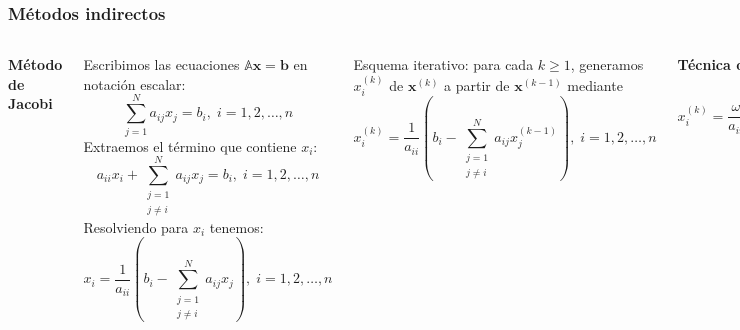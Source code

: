 \documentclass[9pt, aspectratio=169]{beamer}
\begin{document}
\begin{frame}
 \frametitle{Métodos indirectos}
 \begin{columns}[]
\textbf{Método de Jacobi}

Escribimos las ecuaciones $\mathbb{A} \mathbf{x}= \mathbf{b}$ en notación escalar:
\begin{equation*}
 \sum_{j=1}^N a_{ij}x_j = b_i, \; i = 1, 2, \ldots, n
\end{equation*}
Extraemos el término que contiene $x_i$:
\begin{equation*}
 a_{ii}x_i + \sum_{\substack{j=1 \\j \neq i}}^N a_{ij}x_j = b_i, \; i = 1, 2, \ldots, n
\end{equation*}
Resolviendo para $x_i$ tenemos:
\begin{equation*}
 x_i = \dfrac{1}{a_{ii}} \left( b_i - \sum_{\substack{j=1 \\j \neq i}}^N a_{ij}x_j \right), \;  i = 1, 2, \ldots, n
\end{equation*}
 

 Esquema iterativo: para cada $k \geq 1$, generamos $x_i^{(k)}$ de $\bm{x}^{(k)}$ a partir de $\bm{x}^{(k-1)}$ mediante
\begin{equation*}
    x_i^{(k)} = \dfrac{1}{a_{ii}} \left( b_i - \sum_{\substack{j=1 \\j \neq i}}^N a_{ij}x_j^{(k-1)} \right), \;  i = 1, 2, \ldots, n
\end{equation*} \pause

  \textbf{Técnica de relajación:}
\begin{equation*}
    x_i^{(k)} = \dfrac{\omega}{a_{ii}} \left( b_i - \sum_{\substack{j=1 \\j \neq i}}^N a_{ij}x_j^{(k-1)}  \right) + (1-\omega)x_i^{(k - 1)} 
\end{equation*}

Determinación de $\omega$:
Si $\Delta x^{(k)} = \vert x^{(k-1)}-x^{(k)} \vert$ calculado con $\omega = 1$:
\begin{equation*}
 \omega_{\text{opt}} \approx \dfrac{2}{1+\sqrt{1-(\Delta x^{(k+p)})/\Delta x^{(k)})^{1/p}}}
\end{equation*}
donde $p$ es un entero positivo.
\end{columns}
\end{frame}
\end{document}
